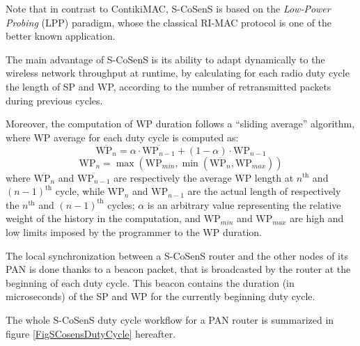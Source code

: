 \documentclass[a4paper,twoside]{article}
\begin{document}
Note that in contrast to ContikiMAC, S-CoSenS is based on the \emph{Low-Power
Probing} (LPP) paradigm, whose the classical RI-MAC protocol \cite{RIMAC}
is one of the better known application.

The main advantage of S-CoSenS is its ability to adapt dynamically to the
wireless network throughput at runtime, by calculating for each radio duty
cycle the length of SP and WP, according to the number of retransmitted
packets during previous cycles.

Moreover, the computation of WP duration follows a ``sliding average''
algorithm, where WP average for each duty cycle is computed as:
\begin{displaymath}
\overline{\mathrm{WP}_{n}} = \alpha \cdot \overline{\mathrm{WP}_{n-1}}
                + (1 - \alpha) \cdot \mathrm{WP}_{n-1}
\end{displaymath}
\begin{displaymath}
\mathrm{WP}_{n} = \max ( \mathrm{WP}_{min},
                  \min ( \overline{\mathrm{WP}_{n}}, \mathrm{WP}_{max} ) )
\end{displaymath}
where $\overline{\mathrm{WP}_{n}}$ and $\overline{\mathrm{WP}_{n-1}}$
are respectively the average WP length at $n^{\mathrm{th}}$ and
$(n-1)^{\mathrm{th}}$ cycle, while $\mathrm{WP}_{n}$ and $\mathrm{WP}_{n-1}$
are the actual length of respectively the $n^{\mathrm{th}}$ and
$(n-1)^{\mathrm{th}}$ cycles; $\alpha$ is an arbitrary value representing
the relative weight of the history in the computation, and
$\mathrm{WP}_{min}$ and $\mathrm{WP}_{max}$ are high and low limits
imposed by the programmer to the WP duration.

The local synchronization between a S-CoSenS router and the other nodes
of its PAN is done thanks to a beacon packet, that is broadcasted by
the router at the beginning of each duty cycle. This beacon contains the
duration (in microseconds) of the SP and WP for the currently beginning
duty cycle.

The whole S-CoSenS duty cycle workflow for a PAN router is summarized
in figure \ref{FigSCosensDutyCycle} hereafter.
\end{document}
